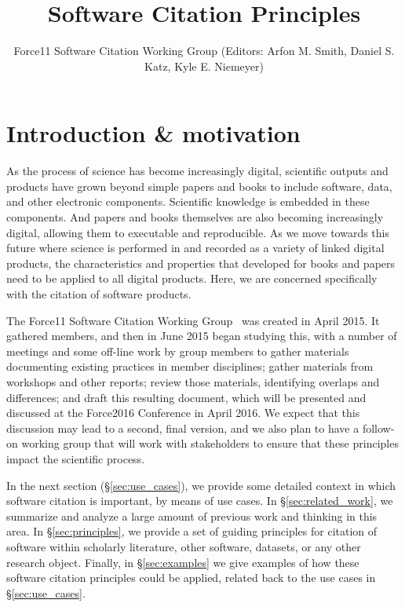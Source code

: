\documentclass[11pt, oneside]{amsart}
\title{Software Citation Principles}
\author{Force11 Software Citation Working Group (Editors: Arfon M. Smith, Daniel S. Katz, Kyle E. Niemeyer)}
\date{}
\begin{document}
\begin{abstract}
\end{abstract}

\maketitle


\section{Introduction \& motivation}
\label{sec:intro}

As the process of science has become increasingly digital, scientific outputs and products have
grown beyond simple papers and books to include software, data, and other electronic
components.  Scientific knowledge is embedded in these components.  And papers and books
themselves are also becoming increasingly digital, allowing them to executable
and reproducible.  As we move towards this future where science is performed in and recorded
as a variety of linked digital products, the characteristics and properties that developed for
books and papers need to be applied to all digital products.  Here, we are concerned specifically
with the citation of software products.

The Force11 Software Citation Working Group~\cite{f11scwg} was created in April 2015.
It gathered members, and then in June 2015 began studying this, with a number of meetings
and some off-line work by group members to gather materials documenting existing
practices in member disciplines; gather materials from workshops and other reports;
review those materials, identifying overlaps and differences; and draft this resulting document,
which will be presented and discussed at the Force2016 Conference \cite{force2016}
in April 2016.  We expect that
this discussion may lead to a second, final version, and we also
plan to have a follow-on working group that will work with stakeholders to ensure that
these principles impact the scientific process.

In the next section (\S\ref{sec:use_cases}), we provide some detailed context in which
software citation is important, by means of use cases.  In \S\ref{sec:related_work}, we
summarize and analyze a large amount of previous work and thinking in this area.  In
\S\ref{sec:principles}, we provide a set of guiding principles for citation of software within
scholarly literature, other software, datasets, or any other research object.  Finally,
in \S\ref{sec:examples} we give examples of how these software citation principles
could be applied, related back to the use cases in \S\ref{sec:use_cases}.
\end{document}
